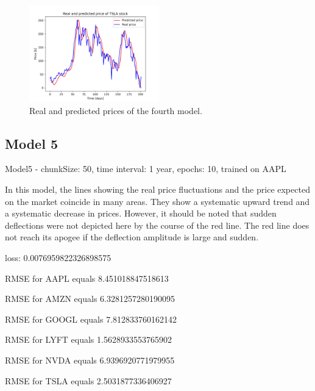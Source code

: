\begin{figure}
\includegraphics[width=0.5\textwidth]{./graf/model4/TSLA.png}
\caption{Real and predicted prices of the fourth model.}
\label{fig:label}
\end{figure} 

\clearpage
\subsection{Model 5}

Model5 - chunkSize: 50, time interval: 1 year, epochs: 10, trained on AAPL\par\bigskip
In this model, the lines showing the real price fluctuations and the price expected on the
market coincide in many areas. They show a systematic upward trend and a systematic decrease in
prices. However, it should be noted that sudden deflections were not depicted here by the course of
the red line. The red line does not reach its apogee if the deflection amplitude is large and sudden.
\par\bigskip
loss: 0.0076959822326898575\par
RMSE for AAPL equals 8.451018847518613\par
RMSE for AMZN equals 6.3281257280190095\par
RMSE for GOOGL equals 7.812833760162142\par
RMSE for LYFT equals 1.5628933553765902\par
RMSE for NVDA equals 6.9396920771979955\par
RMSE for TSLA equals 2.5031877336406927\par

